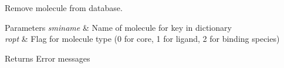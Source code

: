 Remove molecule from database. 


\begin{DoxyParams}{Parameters}
{\em sminame} & Name of molecule for key in dictionary \\
\hline
{\em ropt} & Flag for molecule type (0 for core, 1 for ligand, 2 for binding species) \\
\hline
\end{DoxyParams}
\begin{DoxyReturn}{Returns}
Error messages 
\end{DoxyReturn}
